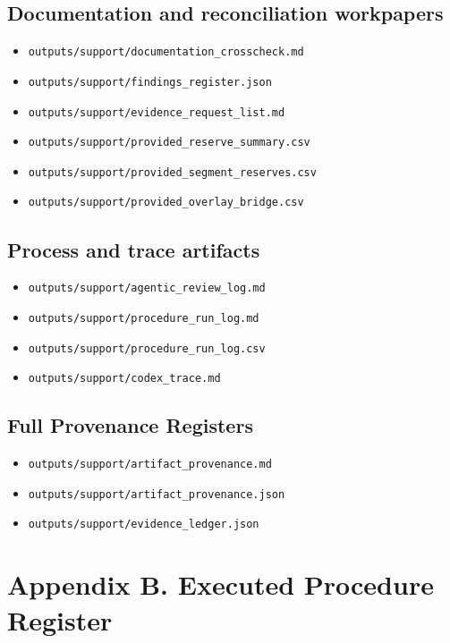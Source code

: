 \documentclass[11pt]{article}
\begin{document}
\subsection*{Documentation and reconciliation workpapers}
\begin{itemize}
\item \texttt{outputs/support/documentation\_crosscheck.md}
\item \texttt{outputs/support/findings\_register.json}
\item \texttt{outputs/support/evidence\_request\_list.md}
\item \texttt{outputs/support/provided\_reserve\_summary.csv}
\item \texttt{outputs/support/provided\_segment\_reserves.csv}
\item \texttt{outputs/support/provided\_overlay\_bridge.csv}
\end{itemize}
\subsection*{Process and trace artifacts}
\begin{itemize}
\item \texttt{outputs/support/agentic\_review\_log.md}
\item \texttt{outputs/support/procedure\_run\_log.md}
\item \texttt{outputs/support/procedure\_run\_log.csv}
\item \texttt{outputs/support/codex\_trace.md}
\end{itemize}
\subsection*{Full Provenance Registers}
\begin{itemize}
\item \texttt{outputs/support/artifact\_provenance.md}
\item \texttt{outputs/support/artifact\_provenance.json}
\item \texttt{outputs/support/evidence\_ledger.json}
\end{itemize}
\section*{Appendix B. Executed Procedure Register}
\end{document}
